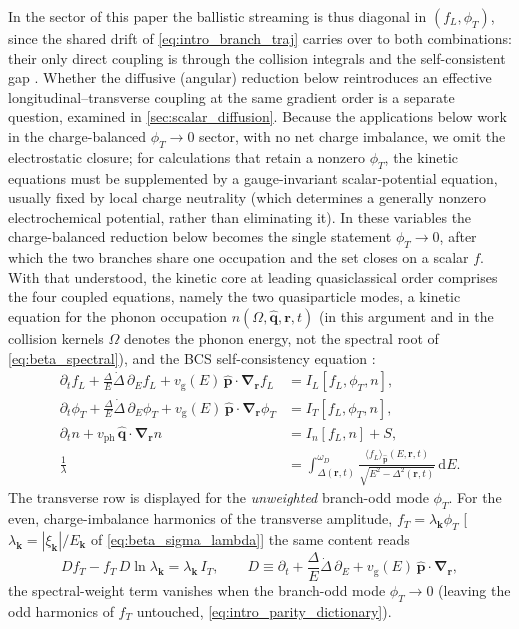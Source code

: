 \documentclass[
  aps,
  prb,
  preprint,
  superscriptaddress,
  longbibliography,
  nofootinbib
]{revtex4-2}
\newcommand{\dd}{\mathrm{d}}
\newcommand{\br}{\mathbf{r}}
\newcommand{\bk}{\mathbf{k}}
\newcommand{\bp}{\mathbf{p}}
\newcommand{\bnabla}{\boldsymbol{\nabla}}
\newcommand{\vg}{v_{\mathrm{g}}}
\newcommand{\fL}{f_L}
\newcommand{\fT}{f_T}
\begin{document}
In the sector of this paper the ballistic streaming is thus diagonal
in \((\fL,\phi_T)\), since the shared drift of
\cref{eq:intro_branch_traj} carries over to both combinations:
their only direct coupling is through the collision integrals and the
self-consistent gap \cite{kopnin2001,schmidschon1975}. Whether the
diffusive (angular) reduction below reintroduces an effective
longitudinal--transverse coupling at the same gradient order is a
separate question, examined in \cref{sec:scalar_diffusion}. Because the applications below work in the charge-balanced
\(\phi_T\to0\) sector, with no net charge imbalance, we
omit the electrostatic closure; for calculations that retain a nonzero
\(\phi_T\), the kinetic equations must be supplemented by a gauge-invariant
scalar-potential equation, usually fixed by local charge neutrality
(which determines a generally nonzero electrochemical potential, rather
than eliminating it). In these variables the charge-balanced
reduction below becomes the single statement \(\phi_T\to0\), after
which the two branches share one occupation and the set closes on a
scalar \(f\). With that understood, the kinetic
core at leading quasiclassical order comprises the four coupled
equations, namely the
two quasiparticle modes, a kinetic equation for the phonon occupation
\(n(\Omega,\hat{\mathbf{q}},\br,t)\) (in this argument and in the
collision kernels \(\Omega\) denotes the phonon energy, not the
spectral root of \cref{eq:beta_spectral}), and the BCS self-consistency
equation \cite{eliashberg1972,kaplan1976,changscalapino1977}:
\begin{align}
  \partial_t \fL
  + \frac{\Delta}{E}\dot{\Delta}\,\partial_E \fL
  + \vg(E)\,\hat{\bp}\cdot\bnabla_{\br}\fL
  &= I_{L}[\fL,\phi_T,n],
  \label{eq:intro_fL}
  \\
  \partial_t \phi_T
  + \frac{\Delta}{E}\dot{\Delta}\,\partial_E \phi_T
  + \vg(E)\,\hat{\bp}\cdot\bnabla_{\br}\phi_T
  &= I_{T}[\fL,\phi_T,n],
  \label{eq:intro_fT}
  \\
  \partial_t n
  + v_{\mathrm{ph}}\,\hat{\mathbf{q}}\cdot\bnabla_{\br} n
  &= I_{n}[\fL,n] + S,
  \label{eq:intro_phonon}
  \\
  \frac{1}{\lambda}
  &= \int_{\Delta(\br,t)}^{\omega_D}
  \frac{\langle\fL\rangle_{\hat{\bp}}(E,\br,t)}{\sqrt{E^{2}-\Delta^{2}(\br,t)}}\,
  \dd E .
  \label{eq:intro_gap}
\end{align}
The transverse row is displayed for the \emph{unweighted} branch-odd mode
\(\phi_T\). For the even, charge-imbalance harmonics of the transverse
amplitude, \(\fT=\lambda_{\bk}\phi_T\) [\(\lambda_{\bk}=|\xi_{\bk}|/
E_{\bk}\) of \cref{eq:beta_sigma_lambda}] the same content reads
\begin{equation}
  D\fT-\fT\,D\ln\lambda_{\bk}=\lambda_{\bk}\,I_{T},
  \qquad
  D\equiv\partial_t+\frac{\Delta}{E}\dot{\Delta}\,\partial_E
  +\vg(E)\,\hat{\bp}\cdot\bnabla_{\br},
  \label{eq:intro_fT_kopnin}
\end{equation}
the spectral-weight term vanishes when the branch-odd mode
\(\phi_T\to0\) (leaving the odd harmonics of \(\fT\) untouched,
\cref{eq:intro_parity_dictionary}).
\end{document}
